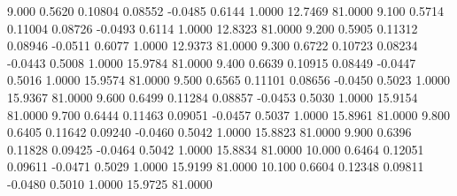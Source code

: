    9.000   0.5620   0.10804   0.08552  -0.0485   0.6144   1.0000  12.7469  81.0000
   9.100   0.5714   0.11004   0.08726  -0.0493   0.6114   1.0000  12.8323  81.0000
   9.200   0.5905   0.11312   0.08946  -0.0511   0.6077   1.0000  12.9373  81.0000
   9.300   0.6722   0.10723   0.08234  -0.0443   0.5008   1.0000  15.9784  81.0000
   9.400   0.6639   0.10915   0.08449  -0.0447   0.5016   1.0000  15.9574  81.0000
   9.500   0.6565   0.11101   0.08656  -0.0450   0.5023   1.0000  15.9367  81.0000
   9.600   0.6499   0.11284   0.08857  -0.0453   0.5030   1.0000  15.9154  81.0000
   9.700   0.6444   0.11463   0.09051  -0.0457   0.5037   1.0000  15.8961  81.0000
   9.800   0.6405   0.11642   0.09240  -0.0460   0.5042   1.0000  15.8823  81.0000
   9.900   0.6396   0.11828   0.09425  -0.0464   0.5042   1.0000  15.8834  81.0000
  10.000   0.6464   0.12051   0.09611  -0.0471   0.5029   1.0000  15.9199  81.0000
  10.100   0.6604   0.12348   0.09811  -0.0480   0.5010   1.0000  15.9725  81.0000
